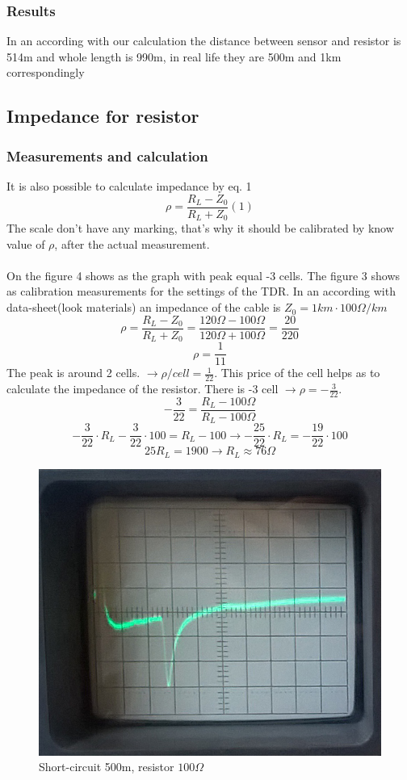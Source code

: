 \documentclass[english]{article}
\begin{document}
\subsubsection{Results}
 In an according with our calculation the distance between sensor and resistor is 514m and whole length is 990m, in real life they are 500m and 1km correspondingly
\subsection{Impedance for resistor}
\subsubsection{Measurements and calculation}
It is also possible to calculate impedance by eq. 1
$$
\rho=\frac{R_L-Z_0}{R_L+Z_0}(1)
$$
The scale don't have any marking, that's why it should be calibrated by know value of $\rho$, after the actual measurement.\\\\
On the figure 4 shows as the graph with peak equal -3 cells. The figure 3 shows as calibration measurements for the settings of the TDR. In an according with data-sheet(look materials) an impedance of the cable is $Z_0=1km \cdot 100\Omega/km$
$$
\rho=\frac{R_L-Z_0}{R_L+Z_0}=\frac{120\Omega-100\Omega}{120\Omega+100\Omega}=\frac{20}{220}
$$
$$
\rho=\frac{1}{11}
$$
The peak is around 2 cells. $\rightarrow \rho/cell=\frac{1}{22}$.
This price of the cell helps as to calculate the impedance of the resistor. There is -3 cell $\rightarrow \rho=-\frac{3}{22}$.
$$
-\frac{3}{22}=\frac{R_L-100\Omega}{R_L-100\Omega}
$$
$$
-\frac{3}{22} \cdot R_L-\frac{3}{22} \cdot 100=R_L-100
\rightarrow
-\frac{25}{22} \cdot R_L= -\frac{19}{22} \cdot 100
$$
$$
25R_L=1900 \rightarrow R_L\approx76\Omega
$$
\begin{figure}[H]
\centerline{\includegraphics[scale=0.4]{Radar/7}}
\caption{Short-circuit 500m, resistor $100 \Omega$}
\end{figure}
\end{document}
